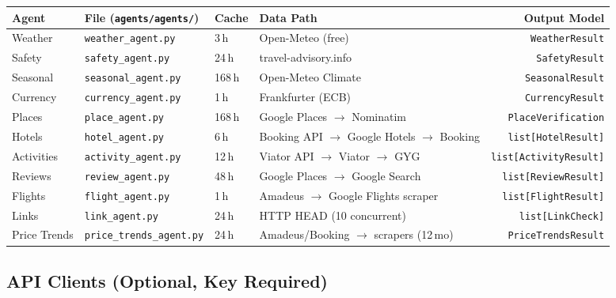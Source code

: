 \documentclass[11pt,a4paper]{article}
\begin{document}
{\small
\begin{tabularx}{\textwidth}{@{}L{2.0cm}L{3.0cm}L{1.2cm}L{4.0cm}R@{}}
\toprule
\textbf{Agent} & \textbf{File} (\texttt{agents/agents/}) & \textbf{Cache} & \textbf{Data Path} & \textbf{Output Model} \\
\midrule
Weather      & \texttt{weather\_agent.py}       & 3\,h   & Open-Meteo (free)                              & \texttt{WeatherResult} \\[4pt]
Safety       & \texttt{safety\_agent.py}        & 24\,h  & travel-advisory.info                           & \texttt{SafetyResult} \\[4pt]
Seasonal     & \texttt{seasonal\_agent.py}      & 168\,h & Open-Meteo Climate                             & \texttt{SeasonalResult} \\[4pt]
Currency     & \texttt{currency\_agent.py}      & 1\,h   & Frankfurter (ECB)                              & \texttt{CurrencyResult} \\[4pt]
Places       & \texttt{place\_agent.py}         & 168\,h & Google Places $\to$ Nominatim                  & \texttt{PlaceVerification} \\[4pt]
Hotels       & \texttt{hotel\_agent.py}         & 6\,h   & Booking API $\to$ Google Hotels $\to$ Booking  & \texttt{list[HotelResult]} \\[4pt]
Activities   & \texttt{activity\_agent.py}      & 12\,h  & Viator API $\to$ Viator $\to$ GYG              & \texttt{list[ActivityResult]} \\[4pt]
Reviews      & \texttt{review\_agent.py}        & 48\,h  & Google Places $\to$ Google Search              & \texttt{list[ReviewResult]} \\[4pt]
Flights      & \texttt{flight\_agent.py}        & 1\,h   & Amadeus $\to$ Google Flights scraper           & \texttt{list[FlightResult]} \\[4pt]
Links        & \texttt{link\_agent.py}          & 24\,h  & HTTP HEAD (10 concurrent)                      & \texttt{list[LinkCheck]} \\[4pt]
Price Trends & \texttt{price\_trends\allowbreak\_agent.py} & 24\,h & Amadeus/Booking $\to$ scrapers (12\,mo) & \texttt{PriceTrendsResult} \\
\bottomrule
\end{tabularx}}

\subsection{API Clients (Optional, Key Required)}
\end{document}
